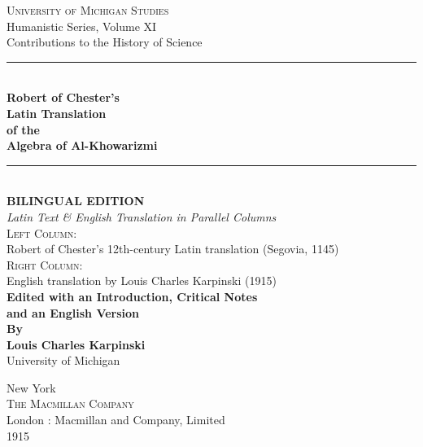 \documentclass[11pt,a4paper,twoside]{book}
\newcommand{\longline}{\noindent\rule{\textwidth}{0.4pt}}
\begin{document}
\frontmatter

\begin{titlepage}
\begin{center}
\vspace*{1.5cm}

{\Large\textsc{University of Michigan Studies}}\\[0.4cm]
{\large Humanistic Series, Volume XI}\\[0.3cm]
{\normalsize Contributions to the History of Science}\\[0.8cm]

\longline\\[1.2cm]

{\Huge\bfseries\color{titlecolor} Robert of Chester's\\[0.3cm]
Latin Translation\\[0.3cm]
of the\\[0.4cm]
Algebra of Al-Khowarizmi}\\[1.2cm]

\longline\\[1.0cm]

{\Large\textbf{BILINGUAL EDITION}}\\[0.5cm]
{\large\textit{Latin Text \& English Translation in Parallel Columns}}\\[1.0cm]

{\large\textsc{Left Column:}\\
Robert of Chester's 12th-century Latin translation (Segovia, 1145)}\\[0.6cm]

{\large\textsc{Right Column:}\\
English translation by Louis Charles Karpinski (1915)}\\[1.2cm]

{\large\textbf{Edited with an Introduction, Critical Notes\\[0.2cm]
and an English Version}}\\[0.8cm]

{\large\textbf{By}}\\[0.2cm]
{\Large\textbf{Louis Charles Karpinski}}\\[0.15cm]
{\normalsize University of Michigan}\\[1.5cm]

\vfill

{\large New York}\\
{\large\textsc{The Macmillan Company}}\\[0.2cm]
London : Macmillan and Company, Limited\\[0.4cm]
{\large 1915}

\end{center}
\end{titlepage}
\end{document}
